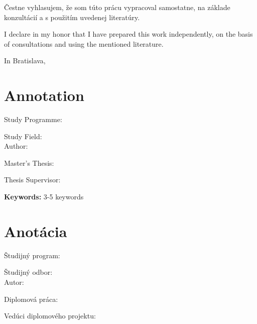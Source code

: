 \newpage
\thispagestyle{empty}
\vspace*{\fill}
Čestne vyhlasujem, že som túto prácu vypracoval samostatne, na základe konzultácií a s použitím uvedenej literatúry.

I declare in my honor that I have prepared this work independently, on the basis of consultations and using the mentioned literature.

\vspace{2cm}
\mbox{}
In Bratislava, \myDate \hfill \myName
\mbox{}

\newpage
\thispagestyle{empty}
\mbox{}
\newpage




\thispagestyle{empty}
\section*{Annotation}
\begin{minipage}[t]{1\columnwidth}%
\myUniversity

\myFaculty

Study Programme: \myStudyProgram

Study Field: \myStudyField\\

Author: \myName

Master's Thesis: \myTitle

Thesis Supervisor: \mySupervisor

\myDate%
\end{minipage}

\bigskip{}
\lipsum[3]

\textbf{Keywords:} 3-5 keywords

\newpage{}
\thispagestyle{empty}





\thispagestyle{empty}
\section*{Anotácia}

\begin{minipage}[t]{1\columnwidth}%
\myUniversitySK

\myFacultySK

Študijný program: \myStudyProgramSK

Študijný odbor:	\myStudyFieldSK\\

Autor: \myName

Diplomová práca: \myTitle

Vedúci diplomového projektu: \mySupervisor

\myDateSK
\end{minipage}

